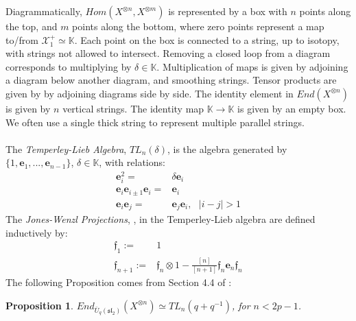 \documentclass[]{article}
\newtheorem{prop}{Proposition}[section]
\begin{document}
Diagrammatically, $Hom(X^{\otimes n},X^{\otimes m})$ is represented by a box with $n$ points along the top, and $m$ points along the bottom, where zero points represent a map to/from $\mathcal{X}^{+}_{1}\simeq\mathbb{K}$. Each point on the box is connected to a string, up to isotopy, with strings not allowed to intersect. Removing a closed loop from a diagram corresponds to multiplying by $\delta\in\mathbb{K}$. Multiplication of maps is given by adjoining a diagram below another diagram, and smoothing strings. Tensor products are given by by adjoining diagrams side by side. The identity element in $End(X^{\otimes n})$ is given by $n$ vertical strings. The identity map $\mathbb{K}\rightarrow\mathbb{K}$ is given by an empty box. We often use a single thick string to represent multiple parallel strings.\\
\\
The \textit{Temperley-Lieb Algebra}, $TL_{n}(\delta)$, is the algebra generated by $\{1,\mathbf{e}_{1},...,\mathbf{e}_{n-1}\}$, $\delta\in\mathbb{K}$, with relations:
\begin{align*}
\mathbf{e}_{i}^{2}=&\delta \mathbf{e}_{i}\\
\mathbf{e}_{i}\mathbf{e}_{i\pm 1}\mathbf{e}_{i}=& \mathbf{e}_{i}\\
\mathbf{e}_{i}\mathbf{e}_{j}=& \mathbf{e}_{j}\mathbf{e}_{i}, \:\:\: \lvert i-j\rvert >1
\end{align*}
The \textit{Jones-Wenzl Projections}, \cite{Wenzl}, in the Temperley-Lieb algebra are defined inductively by:
\begin{align*}
\mathfrak{f}_{1}:=& 1\\
\mathfrak{f}_{n+1}:=& \mathfrak{f}_{n}\otimes 1 -\frac{[n]}{[n+1]}\mathfrak{f}_{n}\mathbf{e}_{n}\mathfrak{f}_{n}
\end{align*}
The following Proposition comes from Section 4.4 of \cite{GST}:
\begin{prop}
$End_{\bar{U}_{q}(\mathfrak{sl}_{2})}(X^{\otimes n})\simeq TL_{n}(q+q^{-1})$, for $n<2p-1$.
\end{prop}
\end{document}
